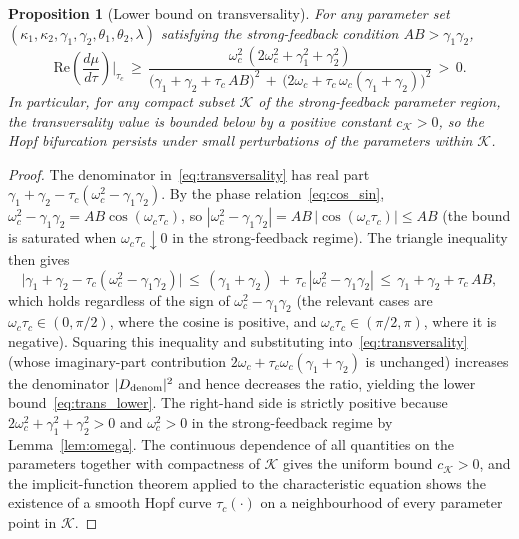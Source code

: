 \documentclass[sn-mathphys,Numbered]{sn-jnl}
\theoremstyle{thmstyleone}
\newtheorem{proposition}[theorem]{Proposition}
\theoremstyle{thmstyletwo}
\theoremstyle{thmstylethree}
\begin{document}
\begin{proposition}[Lower bound on transversality]
\label{prop:transversality_bound}
For any parameter set $(\kappa_1,\kappa_2,\gamma_1,\gamma_2,\theta_1,
\theta_2,\lambda)$ satisfying the strong-feedback condition
$AB>\gamma_1\gamma_2$,
\begin{equation}
\mathrm{Re}\!\left(\frac{d\mu}{d\tau}\right)\!\bigg|_{\tau_c}
\,\geq\,
\frac{\omega_c^{2}\,(2\omega_c^{2}+\gamma_1^{2}+\gamma_2^{2})}
     {\bigl(\gamma_1+\gamma_2+\tau_c\,AB\bigr)^{2}
      \,+\,\bigl(2\omega_c+\tau_c\,\omega_c(\gamma_1+\gamma_2)\bigr)^{2}}
\,>\, 0.
\label{eq:trans_lower}
\end{equation}
In particular, for any compact subset $\mathcal{K}$ of the strong-feedback
parameter region, the transversality value is bounded below by a
positive constant $c_{\mathcal{K}}>0$, so the Hopf bifurcation persists
under small perturbations of the parameters within $\mathcal{K}$.
\end{proposition}
\begin{proof}
The denominator in~\eqref{eq:transversality} has real part
$\gamma_1+\gamma_2-\tau_c(\omega_c^{2}-\gamma_1\gamma_2)$. By the
phase relation~\eqref{eq:cos_sin},
$\omega_c^{2}-\gamma_1\gamma_2 = AB\cos(\omega_c\tau_c)$, so
$|\omega_c^{2}-\gamma_1\gamma_2| = AB\,|\cos(\omega_c\tau_c)|\leq AB$
(the bound is saturated when $\omega_c\tau_c\downarrow 0$ in the
strong-feedback regime). The triangle inequality then gives
\begin{equation*}
\bigl|\gamma_1+\gamma_2-\tau_c(\omega_c^{2}-\gamma_1\gamma_2)\bigr|
\,\leq\, (\gamma_1+\gamma_2)
       \,+\, \tau_c\,|\omega_c^{2}-\gamma_1\gamma_2|
\,\leq\, \gamma_1+\gamma_2+\tau_c\,AB,
\end{equation*}
which holds regardless of the sign of $\omega_c^{2}-\gamma_1\gamma_2$
(the relevant cases are $\omega_c\tau_c\in(0,\pi/2)$, where the cosine
is positive, and $\omega_c\tau_c\in(\pi/2,\pi)$, where it is
negative). Squaring this inequality and substituting
into~\eqref{eq:transversality} (whose imaginary-part contribution
$2\omega_c+\tau_c\omega_c(\gamma_1+\gamma_2)$ is unchanged) increases
the denominator $|D_{\rm denom}|^{2}$ and hence decreases the ratio,
yielding the lower bound~\eqref{eq:trans_lower}. The
right-hand side is strictly positive because
$2\omega_c^{2}+\gamma_1^{2}+\gamma_2^{2}>0$ and $\omega_c^{2}>0$ in
the strong-feedback regime by Lemma~\ref{lem:omega}. The continuous
dependence of all quantities on the parameters together with
compactness of $\mathcal{K}$ gives the uniform bound
$c_{\mathcal{K}}>0$, and the implicit-function theorem applied to the
characteristic equation shows the existence of a smooth Hopf curve
$\tau_c(\cdot)$ on a neighbourhood of every parameter point in
$\mathcal{K}$.
\end{proof}
\end{document}
